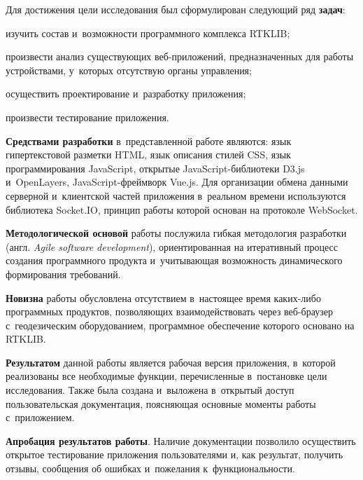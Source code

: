 Для достижения цели исследования был сформулирован следующий ряд \textbf{задач}:

\begin{dashitemize}
  \item изучить состав и~возможности программного комплекса RTKLIB;
  \item произвести анализ существующих веб-приложений, предназначенных для работы устройствами, у~которых отсутствую органы управления;
  \item осуществить проектирование и~разработку приложения;
  \item произвести тестирование приложения.
\end{dashitemize}

\textbf{Средствами разработки} в~представленной работе являются: язык гипертекстовой разметки HTML, язык описания стилей CSS, язык программирования JavaScript, открытые JavaScript-библиотеки D3.js и~OpenLayers, JavaScript-фреймворк Vue.js. Для организации обмена данными серверной и~клиентской частей приложения в~реальном времени используются библиотека Socket.IO, принцип работы которой основан на протоколе WebSocket.

\textbf{Методологической основой} работы послужила гибкая методология разработки (англ. \emph{Agile software development}), ориентированная на итеративный процесс создания программного продукта и~учитывающая возможность динамического формирования требований.

\textbf{Новизна} работы обусловлена отсутствием в~настоящее время каких-либо программных продуктов, позволяющих взаимодействовать через веб-браузер с~геодезическим оборудованием, программное обеспечение которого основано на RTKLIB.

\textbf{Результатом} данной работы является рабочая версия приложения, в~которой реализованы все необходимые функции, перечисленные в~постановке цели исследования. Также была создана и~выложена в~открытый доступ пользовательская документация, поясняющая основные моменты работы с~приложением.

\textbf{Апробация результатов работы}. Наличие документации позволило осуществить открытое тестирование приложения пользователями и, как результат, получить отзывы, сообщения об ошибках и~пожелания к~функциональности.

\newpage
